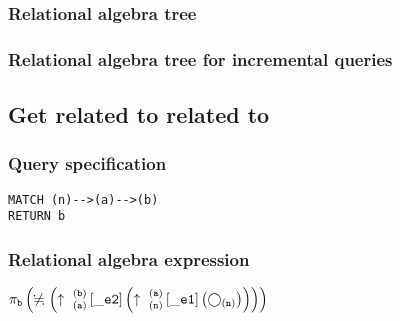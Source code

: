 \subsubsection*{Relational algebra tree}


\subsubsection*{Relational algebra tree for incremental queries}


\subsection{Get related to related to}

\subsubsection*{Query specification}

\begin{lstlisting}
MATCH (n)-->(a)-->(b)
RETURN b
\end{lstlisting}

\subsubsection*{Relational algebra expression}

$\projection{\var{b}} \left(\alldifferent{} \left(\expandout{a}{b}{}{\_e2}{} \left(\expandout{n}{a}{}{\_e1}{} \left(\getvertices{n}{}\right)\right)\right)\right)$

